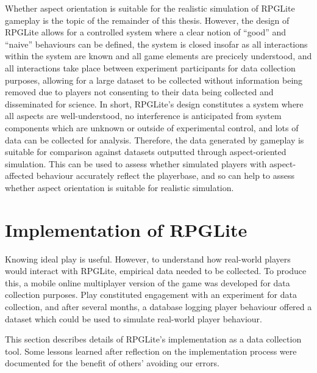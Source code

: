 Whether aspect orientation is suitable for the realistic simulation of RPGLite
gameplay is the topic of the remainder of this thesis. However, the design of
RPGLite allows for a controlled system where a clear notion of ``good'' and
``naive'' behaviours can be defined, the system is closed insofar as all
interactions within the system are known and all game elements are precicely
understood, and all interactions take place between experiment participants for
data collection purposes, allowing for a large dataset to be collected without
information being removed due to players not consenting to their data being
collected and disseminated for science. In short, RPGLite's design constitutes a
system where all aspects are well-understood, no interference is anticipated
from system components which are unknown or outside of experimental control, and
lots of data can be collected for analysis. Therefore, the data generated by
gameplay is suitable for comparison against datasets outputted through
aspect-oriented simulation. This can be used to assess whether simulated players
with aspect-affected behaviour accurately reflect the playerbase, and so can
help to assess whether aspect orientation is suitable for realistic simulation.


\section{Implementation of RPGLite}\label{sec:rpglite_implementation}

Knowing ideal play is useful. However, to understand how real-world players
would interact with RPGLite, empirical data needed to be collected. To produce
this, a mobile online multiplayer version of the game was developed for data
collection purposes. Play constituted engagement with an experiment for data
collection, and after several months, a database logging player behaviour
offered a dataset which could be used to simulate real-world player behaviour.

This section describes details of RPGLite's implementation as a data collection
tool. Some lessons learned after reflection on the implementation process were
documented for the benefit of others' avoiding our
errors\cite{RPGLiteLessonsLearned}.

